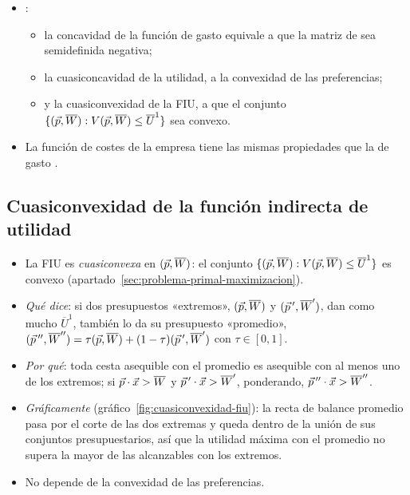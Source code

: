 \documentclass[11pt]{article}
\begin{document}
\begin{itemize}
\begin{itemize}
  \item Es lo que asegura que las condiciones de primer orden del PMU y del PMG sean suficientes\nocite{ArrowEnthoven1961Quasi}.
  \end{itemize}
\item {}:
  \begin{itemize}
  \item la concavidad de la función de gasto equivale a que la matriz de  sea semidefinida negativa;
  \item la cuasiconcavidad de la utilidad, a la convexidad de las preferencias;
  \item y la cuasiconvexidad de la FIU, a que el conjunto $\{(\vec{p},\overline{W}): V(\vec{p},\overline{W})\leq\overline{U}^1\}$ sea convexo.
  \end{itemize}
\item La función de costes de la empresa tiene las mismas propiedades que la de gasto .
\end{itemize}


\subsection{Cuasiconvexidad de la función indirecta de utilidad}\label{anexo:cuasiconvexidad}

\begin{itemize}
\item La FIU es \emph{cuasiconvexa} en $(\vec{p},\overline{W})$: el conjunto $\{(\vec{p},\overline{W}): V(\vec{p},\overline{W})\leq\overline{U}^1\}$ es convexo (apartado~\ref{sec:problema-primal-maximizacion}).
\item \emph{Qué dice}: si dos presupuestos «extremos», $(\vec{p},\overline{W})$ y $(\vec{p}\,',\overline{W}')$, dan como mucho $\overline{U}^1$, también lo da su presupuesto «promedio», $(\vec{p}\,'',\overline{W}'')=\tau(\vec{p},\overline{W})+(1-\tau)(\vec{p}\,',\overline{W}')$ con $\tau\in[0,1]$.
\item \emph{Por qué}: toda cesta asequible con el promedio es asequible con al menos uno de los extremos; si $\vec{p}\cdot\vec{x}>\overline{W}$ y $\vec{p}\,'\cdot\vec{x}>\overline{W}'$, ponderando, $\vec{p}\,''\cdot\vec{x}>\overline{W}''$.\findemo
\item \emph{Gráficamente} (gráfico~\ref{fig:cuasiconvexidad-fiu}): la recta de balance promedio pasa por el corte de las dos extremas y queda dentro de la unión de sus conjuntos presupuestarios, así que la utilidad máxima con el promedio no supera la mayor de las alcanzables con los extremos.
\item No depende de la convexidad de las preferencias.
\end{itemize}
\end{document}
